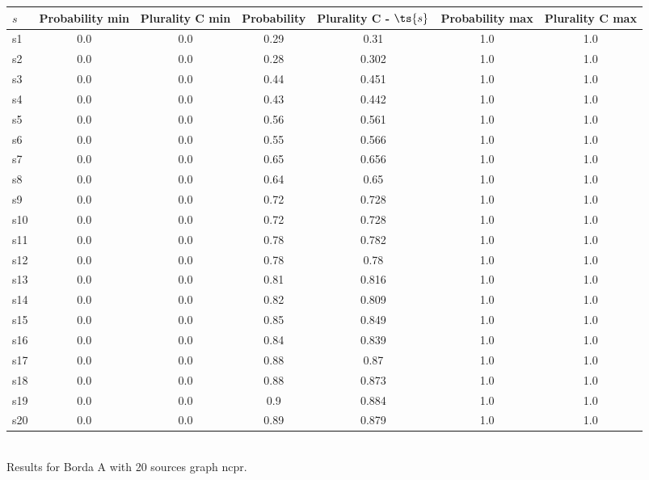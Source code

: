 \documentclass{article}
\begin{document}
\noindent\begin{tabular}{|l|c|c|c|c|c|c|}
\hline
$s$& Probability min & Plurality C min & Probability & Plurality C - $\ts{s}$ & Probability max & Plurality C max\\
\hline
s1 &0.0 & 0.0 & 0.29 & 0.31 & 1.0 & 1.0\\
\hline
s2 &0.0 & 0.0 & 0.28 & 0.302 & 1.0 & 1.0\\
\hline
s3 &0.0 & 0.0 & 0.44 & 0.451 & 1.0 & 1.0\\
\hline
s4 &0.0 & 0.0 & 0.43 & 0.442 & 1.0 & 1.0\\
\hline
s5 &0.0 & 0.0 & 0.56 & 0.561 & 1.0 & 1.0\\
\hline
s6 &0.0 & 0.0 & 0.55 & 0.566 & 1.0 & 1.0\\
\hline
s7 &0.0 & 0.0 & 0.65 & 0.656 & 1.0 & 1.0\\
\hline
s8 &0.0 & 0.0 & 0.64 & 0.65 & 1.0 & 1.0\\
\hline
s9 &0.0 & 0.0 & 0.72 & 0.728 & 1.0 & 1.0\\
\hline
s10 &0.0 & 0.0 & 0.72 & 0.728 & 1.0 & 1.0\\
\hline
s11 &0.0 & 0.0 & 0.78 & 0.782 & 1.0 & 1.0\\
\hline
s12 &0.0 & 0.0 & 0.78 & 0.78 & 1.0 & 1.0\\
\hline
s13 &0.0 & 0.0 & 0.81 & 0.816 & 1.0 & 1.0\\
\hline
s14 &0.0 & 0.0 & 0.82 & 0.809 & 1.0 & 1.0\\
\hline
s15 &0.0 & 0.0 & 0.85 & 0.849 & 1.0 & 1.0\\
\hline
s16 &0.0 & 0.0 & 0.84 & 0.839 & 1.0 & 1.0\\
\hline
s17 &0.0 & 0.0 & 0.88 & 0.87 & 1.0 & 1.0\\
\hline
s18 &0.0 & 0.0 & 0.88 & 0.873 & 1.0 & 1.0\\
\hline
s19 &0.0 & 0.0 & 0.9 & 0.884 & 1.0 & 1.0\\
\hline
s20 &0.0 & 0.0 & 0.89 & 0.879 & 1.0 & 1.0\\
\hline
\end{tabular}\\

\noindent Results for Borda A with 20 sources graph ncpr.
\end{document}
